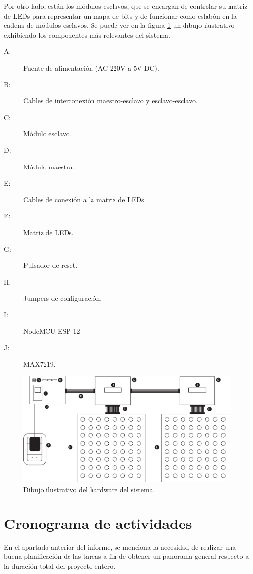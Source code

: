	Por otro lado, están los módulos esclavos, que se encargan de controlar su matriz de LEDs para representar un mapa de bits y de funcionar como eslabón en la cadena de módulos esclavos. Se puede ver en la figura \ref{fig:dibujo-real} un dibujo ilustrativo exhibiendo los componentes más relevantes del sistema.
	\begin{description}
		\item[A: ] Fuente de alimentación (AC 220V a 5V DC).
		\item[B: ] Cables de interconexión maestro-esclavo y esclavo-esclavo.
		\item[C: ] Módulo esclavo.
		\item[D: ] Módulo maestro.
		\item[E: ] Cables de conexión a la matriz de LEDs.
		\item[F: ] Matriz de LEDs.
		\item[G: ] Pulsador de reset.
		\item[H: ] Jumpers de configuración.
		\item[I: ] NodeMCU ESP-12
		\item[J: ] MAX7219.
	\end{description}
	
	\begin{figure}[ht!]
		\begin{center}
			\centering
			\includegraphics[width=1\linewidth]{imagenes/dibujo-fisico.pdf}
			\caption{Dibujo ilustrativo del hardware del sistema.}
			\label{fig:dibujo-real}
		\end{center}
	\end{figure}

	
\section{Cronograma de actividades}

En el apartado anterior del informe, se menciona la necesidad de realizar una buena planificación de las tareas a fin de obtener un panorama general respecto a la duración total del proyecto entero.

